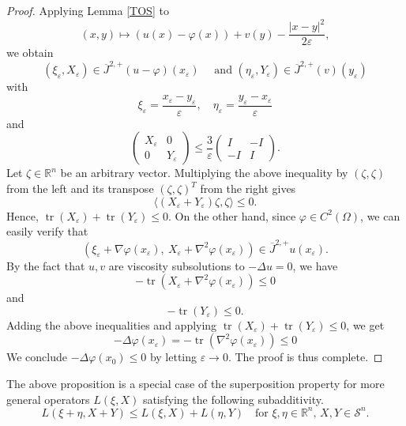 \documentclass[12pt, reqno]{amsart}
\newcommand{\R}{\mathbb{R}}
\newcommand{\Jop}{\overline{J}^{2,+}}
\def\vep{\varepsilon}
\def\R{{\mathbb R}}
\def\S{{\mathcal S}}
\DeclareMathOperator{\tr}{tr}
\begin{document}
\begin{proof}
Applying Lemma \ref{TOS} to 
\[
(x, y)\mapsto (u(x)-\varphi(x))+v(y)-\frac{|x-y|^2}{2\varepsilon},
\] 
we obtain %
\[
(\xi_\varepsilon, X_\varepsilon)\in \Jop(u-\varphi)(x_\varepsilon)\quad\text{ and } (\eta_\varepsilon, Y_\varepsilon)\in \Jop(v)(y_\varepsilon)\]
with
\[
\xi_\varepsilon=\frac{x_\varepsilon-y_\varepsilon}{\varepsilon}, \quad \eta_\varepsilon=\frac{y_\varepsilon-x_\varepsilon}{\varepsilon}
\]
and
\[
\begin{pmatrix}
X_\varepsilon & 0 \\
0 & Y_\varepsilon 
\end{pmatrix}\le \frac{3}{\varepsilon}\begin{pmatrix}
I & -I \\
-I & I 
\end{pmatrix}.
\]
Let $\zeta\in \mathbb{R}^n$ be an arbitrary vector. Multiplying the above inequality by $(\zeta, \zeta)$ from the left and its transpose $(\zeta, \zeta)^T$ from the right gives 
\begin{equation}\label{negH}
\langle(X_\varepsilon+Y_\varepsilon)\zeta, \zeta\rangle \le 0. 
\end{equation}
Hence, $\tr(X_\varepsilon)+\tr(Y_\varepsilon)\le 0.$
On the other hand, since $\varphi\in C^2(\Omega)$, we can easily verify that 
\[
(\xi_\varepsilon+\nabla \varphi(x_\varepsilon), \ X_\varepsilon+\nabla^2\varphi(x_\varepsilon))\in \Jop u(x_\varepsilon).
\]
By the fact that $u,v$ are viscosity subsolutions to $-\Delta u=0$, we have
\[
-\tr(X_\varepsilon+\nabla^2\varphi(x_\varepsilon))\le 0
\]
and 
\[
-\tr(Y_\varepsilon)\le 0.
\]
Adding the above inequalities and applying $\tr(X_\varepsilon)+\tr(Y_\varepsilon)\le 0$, we get
\[
-\Delta \varphi(x_\vep)=-\tr(\nabla^2\varphi(x_\varepsilon))\le 0
\]
 We conclude $-\Delta \varphi(x_0)\leq 0$ by letting $\varepsilon\to 0$. The proof is thus complete. 
\end{proof}

 

The above proposition is a special case of the superposition property for more general operators $L(\xi, X)$ satisfying the following subadditivity.
\begin{equation}\label{sub-add}
L(\xi+\eta, X+Y)\leq L(\xi, X)+L(\eta, Y) \quad \text{for $\xi, \eta\in \R^n$, $X, Y\in \S^n$.}
\end{equation}
\end{document}

